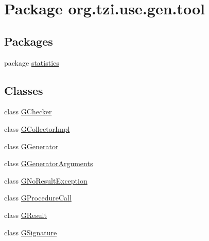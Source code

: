 \hypertarget{namespaceorg_1_1tzi_1_1use_1_1gen_1_1tool}{\section{Package org.\-tzi.\-use.\-gen.\-tool}
\label{namespaceorg_1_1tzi_1_1use_1_1gen_1_1tool}
}
\subsection*{Packages}
\begin{DoxyCompactItemize}
\item 
package \hyperlink{namespaceorg_1_1tzi_1_1use_1_1gen_1_1tool_1_1statistics}{statistics}
\end{DoxyCompactItemize}
\subsection*{Classes}
\begin{DoxyCompactItemize}
\item 
class \hyperlink{classorg_1_1tzi_1_1use_1_1gen_1_1tool_1_1_g_checker}{G\-Checker}
\item 
class \hyperlink{classorg_1_1tzi_1_1use_1_1gen_1_1tool_1_1_g_collector_impl}{G\-Collector\-Impl}
\item 
class \hyperlink{classorg_1_1tzi_1_1use_1_1gen_1_1tool_1_1_g_generator}{G\-Generator}
\item 
class \hyperlink{classorg_1_1tzi_1_1use_1_1gen_1_1tool_1_1_g_generator_arguments}{G\-Generator\-Arguments}
\item 
class \hyperlink{classorg_1_1tzi_1_1use_1_1gen_1_1tool_1_1_g_no_result_exception}{G\-No\-Result\-Exception}
\item 
class \hyperlink{classorg_1_1tzi_1_1use_1_1gen_1_1tool_1_1_g_procedure_call}{G\-Procedure\-Call}
\item 
class \hyperlink{classorg_1_1tzi_1_1use_1_1gen_1_1tool_1_1_g_result}{G\-Result}
\item 
class \hyperlink{classorg_1_1tzi_1_1use_1_1gen_1_1tool_1_1_g_signature}{G\-Signature}
\end{DoxyCompactItemize}
